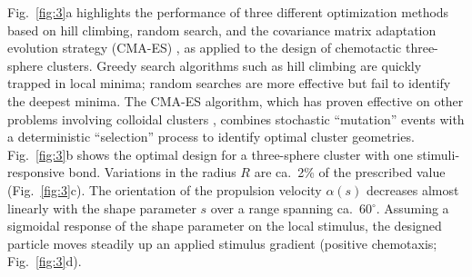 Fig.\ \ref{fig:3}a highlights the performance of three different optimization methods based on hill climbing, random search, and the covariance matrix adaptation evolution strategy (CMA-ES) \cite{hansen2016cma}, as applied to the design of chemotactic three-sphere clusters.  Greedy search algorithms such as hill climbing are quickly trapped in local minima; random searches are more effective but fail to identify the deepest minima.  The CMA-ES algorithm, which has proven effective on other problems involving colloidal clusters \cite{miskin2013adapting}, combines stochastic ``mutation'' events with a deterministic ``selection'' process to identify optimal cluster geometries.  Fig.\ \ref{fig:3}b shows the optimal design for a three-sphere cluster with one stimuli-responsive bond.  Variations in the radius $R$ are ca.\ 2\% of the prescribed value (Fig.\ \ref{fig:3}c).  The orientation of the propulsion velocity $\alpha(s)$ decreases almost linearly with the shape parameter $s$ over a range spanning ca.\ 60$^{\circ}$. Assuming a sigmoidal response of the shape parameter on the local stimulus, the designed particle moves steadily up an applied stimulus gradient (positive chemotaxis; Fig.\ \ref{fig:3}d).

